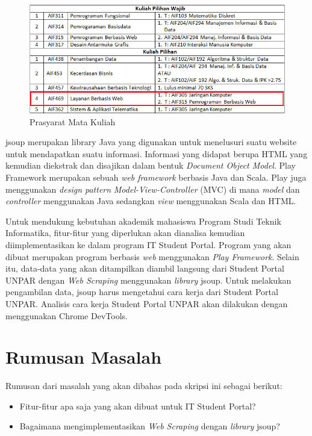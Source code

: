 \begin{figure}
	\centering
	\includegraphics[scale=0.5]{Gambar/contoh-tinyurl}
	\caption{Prasyarat Mata Kuliah} 
	\label{fig:prasyarat_tinyurl}
\end{figure}

jsoup merupakan library Java yang digunakan untuk menelusuri suatu website untuk mendapatkan suatu informasi. Informasi yang didapat berupa HTML yang kemudian diekstrak dan disajikan dalam bentuk \textit{Document Object Model}. Play Framework merupakan sebuah \textit{web framework} berbasis Java dan Scala. Play juga menggunakan \textit{design pattern} \textit{Model-View-Controller} (MVC) di mana \textit{model} dan \textit{controller} menggunakan Java sedangkan \textit{view} menggunakan Scala dan HTML.  

Untuk mendukung kebutuhan akademik mahasiswa Program Studi Teknik Informatika, fitur-fitur yang diperlukan akan dianalisa kemudian diimplementasikan ke dalam program IT Student Portal. Program yang akan dibuat merupakan program berbasis \textit{web} menggunakan \textit{Play Framework}. Selain itu, data-data yang akan ditampilkan diambil langsung dari Student Portal UNPAR dengan \textit{Web Scraping} menggunakan \textit{library} jsoup. Untuk melakukan pengambilan data, jsoup harus mengetahui cara kerja dari Student Portal UNPAR. Analisis cara kerja Student Portal UNPAR akan dilakukan dengan menggunakan Chrome DevTools. 

\section{Rumusan Masalah}
\label{sec:rumusan_masalah}

Rumusan dari masalah yang akan dibahas pada skripsi ini sebagai
berikut:
\begin{itemize}
	\item Fitur-fitur apa saja yang akan dibuat untuk IT Student Portal?
	\item Bagaimana mengimplementasikan \textit{Web Scraping} dengan \textit{library} jsoup?
\end{itemize}

